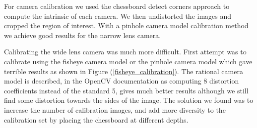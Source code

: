 \documentclass[12pt,letterpaper]{article}
\begin{document}
For camera calibration we used the chessboard detect corners approach to compute the intrinsic of each camera. We then undistorted the images and cropped the region of interest. With a pinhole camera model calibration method we achieve good results for the narrow lens camera.

Calibrating the wide lens camera was much more difficult. First attempt was to calibrate using the fisheye camera model or the pinhole camera model which gave terrible results as shown in Figure (\ref{fisheye_calibration}). The rational camera model is described, in the OpenCV documentation as computing 8 distortion coefficients instead of the standard 5, gives much better results although we still find some distortion towards the sides of the image. The solution we found was to increase the number of calibration images, and add more diversity to the calibration set by placing the chessboard at different depths.
\end{document}
